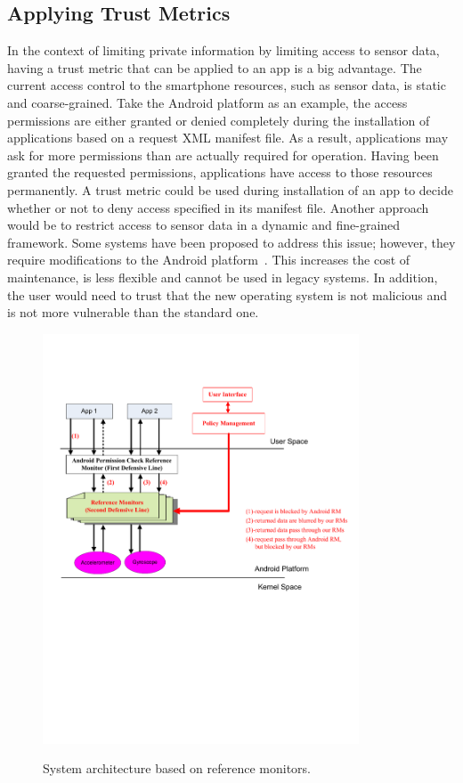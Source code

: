 \subsection{Applying Trust Metrics}
In the context of limiting  private information by limiting access to sensor data,
having a trust metric that can be applied to an app is a big advantage.
The current access control to the smartphone resources,
such as sensor data, is static and coarse-grained. 
Take the
Android platform as an example, the access permissions are
either granted or denied completely during the installation of
applications based on a request XML manifest file. As a result,
applications may ask for more permissions than are actually
required for operation. Having been granted the requested
permissions, applications have access to those resources permanently. 
A trust metric could be used during installation of an app to decide whether or not
to deny access specified in its manifest file.  
Another approach would be to restrict access to sensor data in a
dynamic and fine-grained framework.
Some systems have been proposed to address this
issue; however, they require modifications to the Android
platform~\cite{conti2011crepe, hornyack2011these}. This increases the cost of maintenance, is
less flexible and cannot be used in legacy systems. In addition,
the user would need to trust that the new operating system is
not malicious and is not more vulnerable than the standard one.

\begin{figure}%
  \centering
  \includegraphics[width=3.7in]{refMonDesign.pdf}\\
  \caption{System architecture based on reference monitors.}
  \label{Fig:design}
\end{figure}


